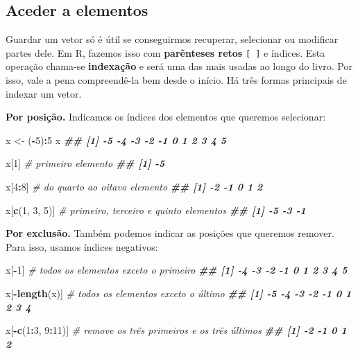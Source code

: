 \documentclass[
  portuguese,
  11pt,
  openany]{book}
\newenvironment{Shaded}{\begin{snugshade}}{\end{snugshade}}
\newcommand{\CommentTok}[1]{\textcolor[rgb]{0.56,0.35,0.01}{\textit{#1}}}
\newcommand{\DecValTok}[1]{\textcolor[rgb]{0.00,0.00,0.81}{#1}}
\newcommand{\DocumentationTok}[1]{\textcolor[rgb]{0.56,0.35,0.01}{\textbf{\textit{#1}}}}
\newcommand{\FunctionTok}[1]{\textcolor[rgb]{0.13,0.29,0.53}{\textbf{#1}}}
\newcommand{\NormalTok}[1]{#1}
\newcommand{\OtherTok}[1]{\textcolor[rgb]{0.56,0.35,0.01}{#1}}
\newcommand{\SpecialCharTok}[1]{\textcolor[rgb]{0.81,0.36,0.00}{\textbf{#1}}}
\begin{document}
\subsection{Aceder a elementos}\label{aceder-a-elementos}

Guardar um vetor só é útil se conseguirmos recuperar, selecionar ou modificar partes dele. Em R, fazemos isso com \textbf{parênteses retos} \texttt{{[}\ {]}} e índices. Esta operação chama-se \textbf{indexação} e será uma das mais usadas ao longo do livro. Por isso, vale a pena compreendê-la bem desde o início. Há três formas principais de indexar um vetor.

\textbf{Por posição.} Indicamos os índices dos elementos que queremos selecionar:

\begin{Shaded}
\begin{Highlighting}[]
\NormalTok{x }\OtherTok{\textless{}{-}}\NormalTok{ (}\SpecialCharTok{{-}}\DecValTok{5}\NormalTok{)}\SpecialCharTok{:}\DecValTok{5}
\NormalTok{x}
\DocumentationTok{\#\#  [1] {-}5 {-}4 {-}3 {-}2 {-}1  0  1  2  3  4  5}

\NormalTok{x[}\DecValTok{1}\NormalTok{]             }\CommentTok{\# primeiro elemento}
\DocumentationTok{\#\# [1] {-}5}

\NormalTok{x[}\DecValTok{4}\SpecialCharTok{:}\DecValTok{8}\NormalTok{]           }\CommentTok{\# do quarto ao oitavo elemento}
\DocumentationTok{\#\# [1] {-}2 {-}1  0  1  2}

\NormalTok{x[}\FunctionTok{c}\NormalTok{(}\DecValTok{1}\NormalTok{, }\DecValTok{3}\NormalTok{, }\DecValTok{5}\NormalTok{)]    }\CommentTok{\# primeiro, terceiro e quinto elementos}
\DocumentationTok{\#\# [1] {-}5 {-}3 {-}1}
\end{Highlighting}
\end{Shaded}

\textbf{Por exclusão.} Também podemos indicar as posições que queremos remover. Para isso, usamos índices negativos:

\begin{Shaded}
\begin{Highlighting}[]
\NormalTok{x[}\SpecialCharTok{{-}}\DecValTok{1}\NormalTok{]            }\CommentTok{\# todos os elementos exceto o primeiro}
\DocumentationTok{\#\#  [1] {-}4 {-}3 {-}2 {-}1  0  1  2  3  4  5}

\NormalTok{x[}\SpecialCharTok{{-}}\FunctionTok{length}\NormalTok{(x)]    }\CommentTok{\# todos os elementos exceto o último}
\DocumentationTok{\#\# [1] {-}5 {-}4 {-}3 {-}2 {-}1  0  1  2  3  4}

\NormalTok{x[}\SpecialCharTok{{-}}\FunctionTok{c}\NormalTok{(}\DecValTok{1}\SpecialCharTok{:}\DecValTok{3}\NormalTok{, }\DecValTok{9}\SpecialCharTok{:}\DecValTok{11}\NormalTok{)] }\CommentTok{\# remove os três primeiros e os três últimos}
\DocumentationTok{\#\# [1] {-}2 {-}1  0  1  2}
\end{Highlighting}
\end{Shaded}
\end{document}
